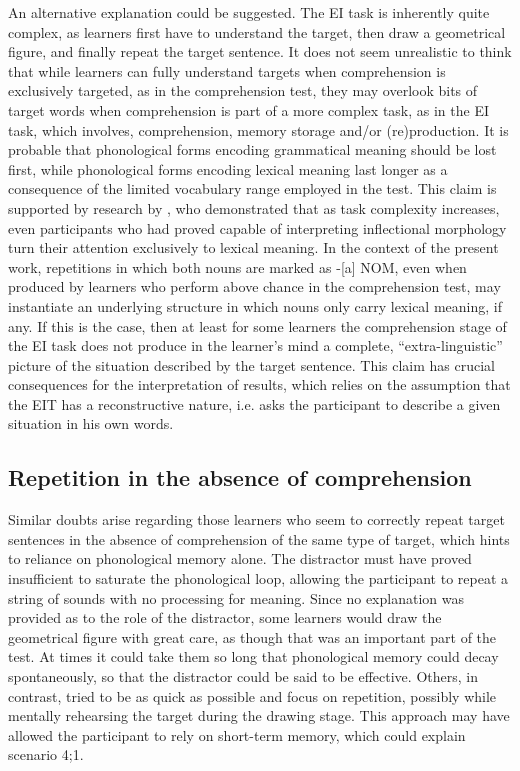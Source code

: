 An alternative explanation could be suggested. The EI task is inherently quite complex, as learners first have to understand the target, then draw a geometrical figure, and finally repeat the target sentence. It does not seem unrealistic to think that while learners can fully understand targets when comprehension is exclusively targeted, as in the comprehension test, they may overlook bits of target words when comprehension is part of a more complex task, as in the EI task, which involves, comprehension, memory storage and/or (re)production. It is probable that phonological forms encoding grammatical meaning should be lost first, while phonological forms encoding lexical meaning last longer as a consequence of the limited vocabulary range employed in the test. This claim is supported by research by \citet{EllisSagarra2011}, who demonstrated that as task complexity increases, even participants who had proved capable of interpreting inflectional morphology turn their attention exclusively to lexical meaning. In the context of the present work, repetitions in which both nouns are marked as -[a] NOM, even when produced by learners who perform above chance in the comprehension test, may instantiate an underlying structure in which nouns only carry lexical meaning, if any. If this is the case, then at least for some learners the comprehension stage of the EI task does not produce in the learner’s mind a complete, “extra-linguistic” picture of the situation described by the target sentence. This claim has crucial consequences for the interpretation of results, which relies on the assumption that the EIT has a reconstructive nature, i.e. asks the participant to describe a given situation in his own words.

\subsection{Repetition in the absence of comprehension}\label{sec:08:4.2}

Similar doubts arise regarding those learners who seem to correctly repeat target sentences in the absence of comprehension of the same type of target, which hints to reliance on phonological memory alone. The distractor must have proved insufficient to saturate the phonological loop, allowing the participant to repeat a string of sounds with no processing for meaning. Since no explanation was provided as to the role of the distractor, some learners would draw the geometrical figure with great care, as though that was an important part of the test. At times it could take them so long that phonological memory could decay spontaneously, so that the distractor could be said to be effective. Others, in contrast, tried to be as quick as possible and focus on repetition, possibly while mentally rehearsing the target during the drawing stage. This approach may have allowed the participant to rely on short-term memory, which could explain scenario 4;1. 

